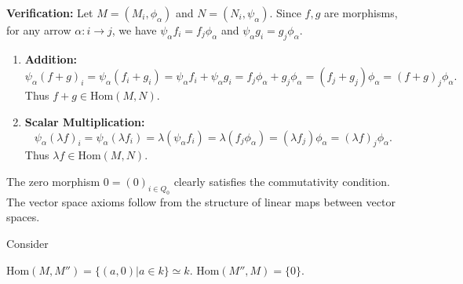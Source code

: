 \documentclass[11pt, a4paper]{report}
\begin{document}
\textbf{Verification:} Let $ M=(M_i, \phi_\alpha) $ and $ N=(N_i, \psi_\alpha) $. Since $ f,g $ are morphisms, for any arrow $ \alpha: i \to j $, we have $ \psi_\alpha f_i = f_j \phi_\alpha $ and $ \psi_\alpha g_i = g_j \phi_\alpha $.
\begin{enumerate}
    \item \textbf{Addition:}
    \[
    \psi_\alpha (f+g)_i = \psi_\alpha (f_i + g_i) = \psi_\alpha f_i + \psi_\alpha g_i = f_j \phi_\alpha + g_j \phi_\alpha = (f_j + g_j) \phi_\alpha = (f+g)_j \phi_\alpha.
    \]
    Thus $ f+g \in \mathrm{Hom}(M,N) $.
    \item \textbf{Scalar Multiplication:}
    \[
    \psi_\alpha (\lambda f)_i = \psi_\alpha (\lambda f_i) = \lambda (\psi_\alpha f_i) = \lambda (f_j \phi_\alpha) = (\lambda f_j) \phi_\alpha = (\lambda f)_j \phi_\alpha.
    \]
    Thus $ \lambda f \in \mathrm{Hom}(M,N) $.
\end{enumerate}
The zero morphism $ 0=(0)_{i \in Q_0} $ clearly satisfies the commutativity condition. The vector space axioms follow from the structure of linear maps between vector spaces.

\begin{example} 
Consider 
 \begin{center}
\end{center}
$ \mathrm{Hom}(M,M'') =\{ (a,0) | a \in k \} \simeq k $. $\mathrm{Hom}(M'',M) =\{ 0\} $. 
\end{example}
\end{document}
